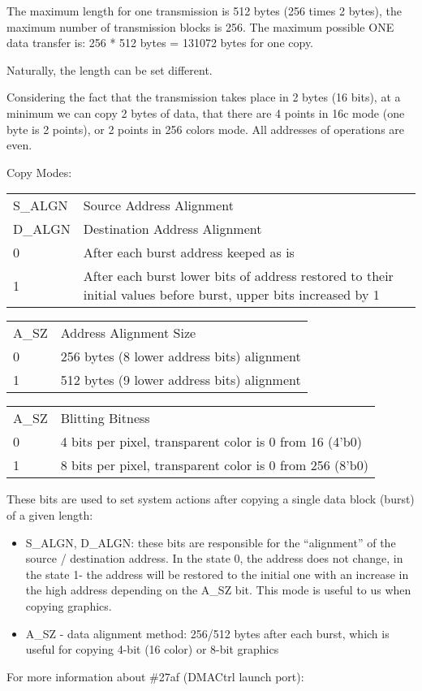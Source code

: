 The maximum length for one transmission is 512 bytes (256 times 2
bytes), the maximum number of transmission blocks is 256. The maximum
possible ONE data transfer is: 256 * 512 bytes = 131072 bytes for one
copy.

Naturally, the length can be set different.

Considering the fact that the transmission takes place in 2 bytes (16
bits), at a minimum we can copy 2 bytes of data, that there are 4
points in 16c mode (one byte is 2 points), or 2 points in 256 colors
mode. All addresses of operations are even.

Copy Modes:
\begin{table}
\begin{tabular}{lp{4in}}
S\_ALGN & Source Address Alignment\\
D\_ALGN & Destination Address Alignment\\
0 & After each burst address keeped as is\\
1 & After each burst lower bits of address restored to their initial
values before burst, upper bits increased by 1
\end{tabular}
\end{table}
\begin{table}
\begin{tabular}{lp{4in}}
A\_SZ & Address Alignment Size\\
0 & 256 bytes (8 lower address bits) alignment\\
1 & 512 bytes (9 lower address bits) alignment
\end{tabular}
\end{table}
\begin{table}
\begin{tabular}{lp{4in}}
A\_SZ & Blitting Bitness\\
0 & 4 bits per pixel, transparent color is 0 from 16 (4'b0)\\
1 & 8 bits per pixel, transparent color is 0 from 256 (8'b0)
\end{tabular}
\end{table}
These bits are used to set system actions after copying a single data
block (burst) of a given length:
\begin{itemize}
\item S\_ALGN, D\_ALGN: these bits are responsible for the “alignment”
  of the source / destination address. In the state 0, the address
  does not change, in the state 1- the address will be restored to the
  initial one with an increase in the high address depending on the
  A\_SZ bit. This mode is useful to us when copying graphics.
\item A\_SZ - data alignment method: 256/512 bytes after each burst,
  which is useful for copying 4-bit (16 color) or 8-bit graphics
\end{itemize}
For more information about \#27af (DMACtrl launch port):

